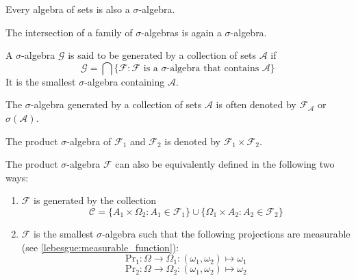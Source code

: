 	\begin{result}
		Every algebra of sets is also a $\sigma$-algebra.
	\end{result}
    
	\begin{property}
		The intersection of a family of $\sigma$-algebras is again a $\sigma$-algebra.
	\end{property}
    
	\begin{definition}
		A $\sigma$-algebra $\mathcal{G}$ is said to be generated by a collection of sets $\mathcal{A}$ if
        	\begin{equation}
			\label{set:generated_sigma_algebra}
        		\mathcal{G} = \bigcap\{\mathcal{F}:\mathcal{F} \text{ is a } \sigma\text{-algebra that contains } \mathcal{A}\}
		\end{equation}
	        It is the smallest $\sigma$-algebra containing $\mathcal{A}$.
	\end{definition}
	\begin{notation}\label{set:notation:generated_sigma_algebra}
		The $\sigma$-algebra generated by a collection of sets $\mathcal{A}$ is often denoted by $\mathcal{F}_\mathcal{A}$ or $\sigma(\mathcal{A})$.
	\end{notation}
    

	\begin{notation}
		The product $\sigma$-algebra of $\mathcal{F}_1$ and $\mathcal{F}_2$ is denoted by $\mathcal{F}_1\times\mathcal{F}_2$.
	\end{notation}
    
	\begin{adefinition}
		The product $\sigma$-algebra $\mathcal{F}$ can also be equivalently defined in the following two ways:
        	\begin{enumerate}
			\item $\mathcal{F}$ is generated by the collection
	            		\[\mathcal{C} = \{A_1\times \Omega_2:A_1\in\mathcal{F}_1\}\cup\{\Omega_1\times A_2:A_2\in\mathcal{F}_2\}\]
		        \item $\mathcal{F}$ is the smallest $\sigma$-algebra such that the following projections are measurable (see \ref{lebesgue:measurable_function}):
			        \[\text{Pr}_1:\Omega\rightarrow\Omega_1:(\omega_1,\omega_2)\mapsto\omega_1\]
        	    		\[\text{Pr}_2:\Omega\rightarrow\Omega_2:(\omega_1,\omega_2)\mapsto\omega_2\]
		\end{enumerate}
	\end{adefinition}
    
